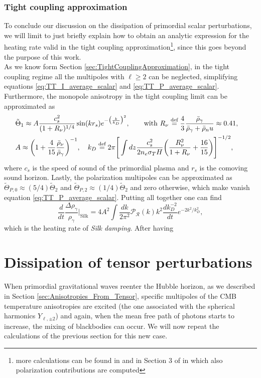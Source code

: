 \subsubsection{Tight coupling approximation}
To conclude our discussion on the dissipation of primordial scalar perturbations, we will limit to just briefly explain how to obtain an analytic expression for the heating rate valid in the tight coupling approximation\footnote{more calculations can be found in \cite{Chluba_2x2} and in Section 3 of \cite{Chluba_tens_diss} in which also polarization contributions are computed}, since this goes beyond the purpose of this work.\\
As we know form Section \ref{sec:TightCouplingApproximation}, in the tight coupling regime all the multipoles with $\ell\geq2$ can be neglected, simplifying equations \eqref{eq:TT_I_average_scalar} and \eqref{eq:TT_P_average_scalar}. Furthermore, the monopole anisotropy in the tight coupling limit can be approximated as
\begin{align*}
    &\tilde\Theta_1\approx A\frac{c_s^2}{(1+R_\nu)^{1/4}}\sin(kr_s)e^{-\big(\frac{k}{k_D}\big)^2},\qquad \text{with }R_\nu\stackrel{\text{def}}{=} \frac{4}{3}\frac{\bar\rho_\gamma}{\bar\rho_\gamma+\bar\rho_nu}\approx0.41 ,&&\\ &A\approx\bigg(1+\frac{4}{15}\frac{\bar\rho_\nu}{\bar\rho_\gamma}\bigg)^{-1},\quad k_D\stackrel{\text{def}}{=}2\pi\Bigg[\int dz\frac{c_s^2}{2n_e\sigma_T H}\bigg(\frac{R_\nu^2}{1+R_\nu}+\frac{16}{15}\bigg)\Bigg]^{-1/2},&&
\end{align*}
where $c_s$ is the speed of sound of the primordial plasma and $r_s$ is the comoving sound horizon. Lastly, the polarization multipoles can be approximated as $\tilde \Theta_{P,0}\approx (5/4)\tilde\Theta_2$ and $\tilde \Theta_{P,2}\approx (1/4)\tilde\Theta_2$ and zero otherwise, which make vanish equation \eqref{eq:TT_P_average_scalar}. Putting all together one can find 
\begin{equation}
    \frac{d}{dt}\frac{\Delta \rho_\gamma}{\rho_\gamma}\Bigg|_\text{Silk}=4A^2\int\frac{dk}{2\pi^2}\mathcal P_\mathcal R(k)k^2 \frac{dk_D^{-2}}{dt}e^{-2 {k^2}/{k_D^2}},
\end{equation}
which is the heating rate of \emph{Silk damping}. After having 
\section{Dissipation of tensor perturbations}
When primordial gravitational waves reenter the Hubble horizon, as we described in Section \ref{sec:Anisotropies_From_Tensor}, specific multipoles of the CMB temperature anisotropies are excited (the one associated with the spherical harmonics $Y_{\ell,\pm2}$) and again, when the mean free path of photons starts to increase, the mixing of blackbodies can occur. We will now repeat the calculations of the previous section for this new case.

